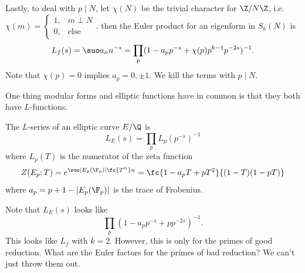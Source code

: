 Lastly, to deal with $p\mid N$, let $\chi(N)$ be the trivial character for $\Z/N\Z$, i.e. $\chi(m)=\begin{cases}
1,&m\perp N\\
0,&\text{else}
\end{cases}$. then the Euler product for an eigenform in $S_k(N)$ is
\[
L_f(s)=\suo a_nn^{-s}=\prod_p (1-a_pp^{-s}+\chi(p)p^{k-1}p^{-2s})^{-1}.
\]
Note that $\chi(p)=0$ implies $a_p=0,\pm 1$. We kill the terms with $p\mid N$.

One thing modular forms and elliptic functions have in common is that they both have $L$-functions.
\begin{df}
The $L$-series of an elliptic curve $E/\Q$ is
\[
L_E(s)=\prod_p L_p(p^{-s})^{-1}
\]
where $L_p(T)$ is the numerator of the zeta function
\[
Z(E_p;T)=e^{\suo |E_p(\F_p)|\fc{T^n}n}=\fc{1-a_pT+pT^2}{(1-T)(1-pT)}
\]
where $a_p=p+1-|E_p(\F_p)|$ is the trace of Frobenius.
\end{df}
 Note that $L_E(s)$ looks like
\[
\prod_p (1-a_p p^{-s}+pp^{-2s})^{-1}.
\]
This looks like $L_f$ with $k=2$. 
However, this is only for the primes of good reduction. What are the Euler factors for the primes of bad reduction? We can't just throw them out.

